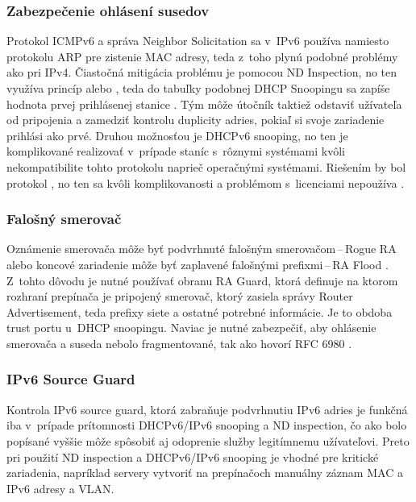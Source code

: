 \subsubsection*{Zabezpečenie ohlásení susedov}
Protokol ICMPv6 a správa Neighbor Solicitation sa v~IPv6 používa namiesto protokolu ARP pre zistenie MAC adresy, teda z~toho plynú podobné problémy ako pri IPv4. Čiastočná mitigácia problému je pomocou ND Inspection, no ten využíva princíp  alebo , teda do tabuľky podobnej DHCP Snoopingu sa zapíše hodnota prvej prihlásenej stanice \cite{Gregr522015} \cite{Podermanski1222015}. Tým môže útočník taktiež odstaviť užívateľa od pripojenia a zamedziť kontrolu duplicity adries, pokiaľ si svoje zariadenie prihlási ako prvé. Druhou možnosťou je DHCPv6 snooping, no ten je komplikované realizovať v~prípade staníc s~rôznymi systémami kvôli nekompatibilite tohto protokolu naprieč operačnými systémami. Riešením by bol protokol , no ten sa kvôli komplikovanosti a problémom s~licenciami nepoužíva \cite{Alsadeh1252015}.   

\subsubsection*{Falošný smerovač}
Oznámenie smerovača môže byť podvrhnuté falošným smerovačom\,--\,Rogue RA alebo koncové zariadenie môže byť zaplavené falošnými prefixmi\,--\,RA Flood \cite{Gregr522015} \cite{Podermanski1222015}. Z~tohto dôvodu je nutné používať obranu RA Guard, ktorá definuje na ktorom rozhraní prepínača je pripojený smerovač, ktorý zasiela správy Router Advertisement, teda prefixy siete a ostatné potrebné informácie. Je to obdoba trust portu u~DHCP snoopingu. Naviac je nutné zabezpečiť, aby ohlásenie smerovača a suseda nebolo fragmentované, tak ako hovorí RFC 6980 \cite{rfc6980YBLH6JtaHyFaxE8i}.

\subsubsection*{IPv6 Source Guard}
Kontrola IPv6 source guard, ktorá zabraňuje podvrhnutiu IPv6 adries je funkčná iba v~prípade prítomnosti DHCPv6/IPv6 snooping a ND inspection, čo ako bolo popísané vyššie môže spôsobiť aj odoprenie služby legitímnemu užívateľovi. Preto pri použití ND inspection a DHCPv6/IPv6 snooping je vhodné pre kritické zariadenia, napríklad servery vytvoriť na prepínačoch manuálny záznam MAC a IPv6 adresy a VLAN.    

